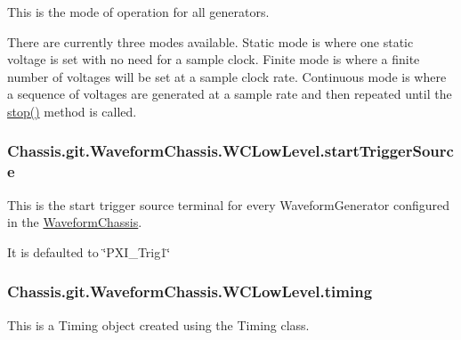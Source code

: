 This is the mode of operation for all generators. 

There are currently three modes available. Static mode is where one static voltage is set with no need for a sample clock. Finite mode is where a finite number of voltages will be set at a sample clock rate. Continuous mode is where a sequence of voltages are generated at a sample rate and then repeated until the \hyperlink{class_chassis_8git_1_1_waveform_chassis_1_1_w_c_low_level_a0f23609abb797d0bed574fcb92f70e2d}{stop()} method is called. \hypertarget{class_chassis_8git_1_1_waveform_chassis_1_1_w_c_low_level_a54b88f1ab4328002a5c8745ec2cc8dec}{
\subsubsection[{start\-Trigger\-Source}]{\setlength{\rightskip}{0pt plus 5cm}Chassis.\-git.\-Waveform\-Chassis.\-W\-C\-Low\-Level.\-start\-Trigger\-Source}}\label{class_chassis_8git_1_1_waveform_chassis_1_1_w_c_low_level_a54b88f1ab4328002a5c8745ec2cc8dec}


This is the start trigger source terminal for every Waveform\-Generator configured in the \hyperlink{class_chassis_8git_1_1_waveform_chassis_1_1_waveform_chassis}{Waveform\-Chassis}. 

It is defaulted to \char`\"{}\-P\-X\-I\-\_\-\-Trig1\char`\"{} \hypertarget{class_chassis_8git_1_1_waveform_chassis_1_1_w_c_low_level_a7e79ab2a3987e1f62ddba2cb94613af9}{
\subsubsection[{timing}]{\setlength{\rightskip}{0pt plus 5cm}Chassis.\-git.\-Waveform\-Chassis.\-W\-C\-Low\-Level.\-timing}}\label{class_chassis_8git_1_1_waveform_chassis_1_1_w_c_low_level_a7e79ab2a3987e1f62ddba2cb94613af9}


This is a Timing object created using the Timing class. 

